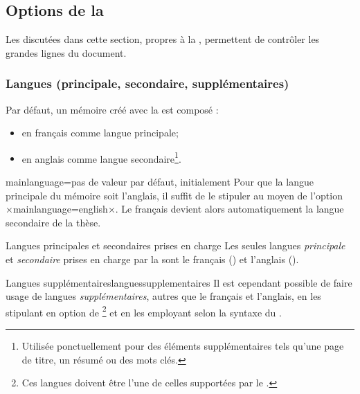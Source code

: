 \subsection{Options de la \yatcl}\label{sec:options-yatcl}

Les  discutées dans cette section, propres à la \yatcl{},
permettent de contrôler les grandes lignes du document.

\subsubsection{Langues (principale, secondaire,
  supplémentaires)}\label{sec:langues}

Par défaut, un mémoire créé avec la \yatcl est composé :
\begin{itemize}
\item en français comme langue principale;
\item en anglais comme langue secondaire\footnote{Utilisée ponctuellement pour
    des éléments supplémentaires tels qu'une page de titre, un résumé ou des
    mots clés.}.
\end{itemize}
%
\begin{docKey}{mainlanguage}{=\textbar{}}{pas
    de valeur par défaut, initialement }
  Pour que la langue principale  du mémoire soit
  l'anglais, il suffit de le stipuler au moyen de l'option
  ×mainlanguage=english×. Le français devient alors automatiquement la langue
  secondaire de la thèse.
\end{docKey}

\begin{dbwarning}{Langues principales et secondaires prises en charge}{}
  Les seules langues \emph{principale} et \emph{secondaire} prises en charge
  par la \yatcl sont le français () et l'anglais
  ().
\end{dbwarning}

\begin{dbremark}{Langues supplémentaires}{languessupplementaires}
  Il est cependant possible de faire usage de langues \emph{supplémentaires},
  autres que le français et l'anglais, en les stipulant en option de
  \footnote{Ces langues doivent être l'une de
    celles supportées par le .} et en les employant selon la
  syntaxe du .
\end{dbremark}

